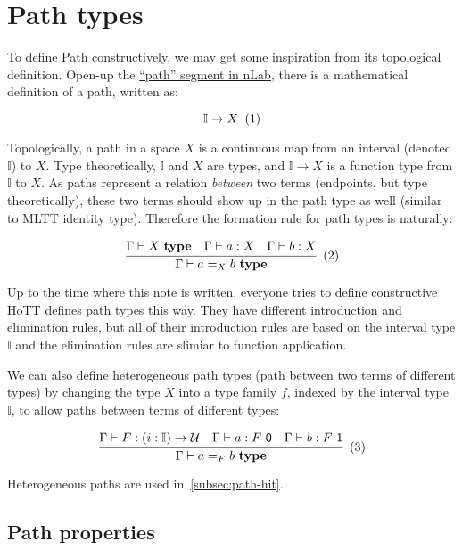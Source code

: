 \section{Path types}
\label{sec:path}

To define Path constructively,
we may get some inspiration from its topological definition.
Open-up the \href{https://ncatlab.org/nlab/show/path}{``path'' segment in nLab},
there is a mathematical definition of a path, written as:

\[
  \mathbb I \rightarrow X
  \xtag
\]

Topologically, a path in a space $X$ is a continuous map
from an interval (denoted $\mathbb I$) to $X$.
Type theoretically, $\mathbb I$ and $X$ are types,
and $\mathbb I \rightarrow X$ is a function type from $\mathbb I$ to $X$.
As paths represent a relation \textit{between} two terms
(endpoints, but type theoretically),
these two terms should show up in the path type as well
(similar to MLTT identity type).
Therefore the formation rule for path types is naturally:

\[
  \cfrac{
    \Gamma \vdash X~\textbf{type}
    \quad
    \Gamma \vdash a : X
    \quad
    \Gamma \vdash b : X
  }{\Gamma \vdash a =_X b~\textbf{type}}
  \xtag
\]

Up to the time where this note is written,
everyone tries to define constructive HoTT defines path types this way.
They have different introduction and elimination rules,
but all of their introduction rules are
based on the interval type $\mathbb I$
and the elimination rules are slimiar to function application.

We can also define heterogeneous path types
(path between two terms of different types)
by changing the type $X$ into a type family $f$,
indexed by the interval type $\mathbb I$,
to allow paths between terms of different types:

\[
  \cfrac{
    \Gamma \vdash F : (i : \mathbb I) \rightarrow \mathcal U
    \quad
    \Gamma \vdash a : F~\textsf 0
    \quad
    \Gamma \vdash b : F~\textsf 1
  }{\Gamma \vdash a =_F b ~\textbf{type}}
  \xtag \label{eqn:hetero-path}
\]

Heterogeneous paths are used in~\cref{subsec:path-hit}.



\subsection{Path properties}
\label{subsec:path-prop}


